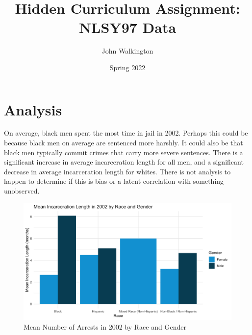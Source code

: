 \documentclass{article}
\author{John Walkington}
\title{Hidden Curriculum Assignment: NLSY97 Data}
\date{Spring 2022}
\begin{document}
\maketitle

\section{Analysis}

On average, black men spent the most time in jail in 2002.  Perhaps this could be because black men on average are sentenced more harshly.  It could also be that black men typically commit crimes that carry more severe sentences.  There is a significant increase in average incarceration length for all men, and a significant decrease in average incarceration length for whites.  There is not analysis to happen to determine if this is bias or a latent correlation with something unobserved.

\begin{figure}[H]
    \begin{center}
        \includegraphics[width=.85\textwidth]{incarc_length_by_racegender}
    \end{center}
    \caption{Mean Number of Arrests in 2002 by Race and Gender}
    \label{fig:graph}
\end{figure}






\end{document}
